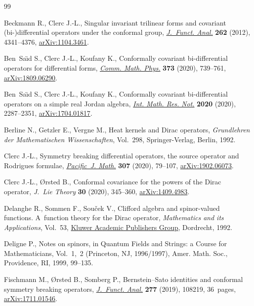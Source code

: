 \begin{thebibliography}{99}
\footnotesize\itemsep=0pt

Beckmann R., Clerc J.-L., Singular invariant trilinear forms and covariant
 (bi-)differential operators under the conformal group, \href{https://doi.org/10.1016/j.jfa.2012.02.021}{\textit{J.~Funct.
 Anal.}} \textbf{262} (2012), 4341--4376, \href{https://arxiv.org/abs/1104.3461}{arXiv:1104.3461}.

Ben~Sa\"{\i}d S., Clerc J.-L., Koufany K., Conformally covariant bi-differential
 operators for differential forms, \href{https://doi.org/10.1007/s00220-019-03431-6}{\textit{Comm. Math. Phys.}} \textbf{373}
 (2020), 739--761, \href{https://arxiv.org/abs/1809.06290}{arXiv:1809.06290}.

Ben~Sa\"{\i}d S., Clerc J.-L., Koufany K., Conformally covariant bi-differential
 operators on a simple real {J}ordan algebra, \href{https://doi.org/10.1093/imrn/rny082}{\textit{Int. Math. Res. Not.}}
 \textbf{2020} (2020), 2287--2351, \href{https://arxiv.org/abs/1704.01817}{arXiv:1704.01817}.

Berline N., Getzler E., Vergne M., Heat kernels and {D}irac operators,
 \textit{Grundlehren der Mathematischen Wissenschaften}, Vol.~298, Springer-Verlag, Berlin, 1992.

Clerc J.-L., Symmetry breaking differential operators, the source operator and
 {R}odrigues formulae, \href{https://doi.org/10.2140/pjm.2020.307.79}{\textit{Pacific~J. Math.}} \textbf{307} (2020), 79--107,
 \href{https://arxiv.org/abs/1902.06073}{arXiv:1902.06073}.

Clerc J.-L., {\O}rsted B., Conformal covariance for the powers of the {D}irac
 operator, \textit{J.~Lie Theory} \textbf{30} (2020), 345--360,
 \href{https://arxiv.org/abs/1409.4983}{arXiv:1409.4983}.

Delanghe R., Sommen F., Sou\v{c}ek V., Clifford algebra and spinor-valued
 functions. A~function theory for the Dirac operator, \textit{Mathematics and
 its Applications}, Vol.~53, \href{https://doi.org/10.1007/978-94-011-2922-0}{Kluwer Academic Publishers Group}, Dordrecht,
 1992.

Deligne P., Notes on spinors, in Quantum Fields and Strings: a Course for
 Mathematicians, {V}ol.~1,~2 ({P}rinceton, {NJ}, 1996/1997), Amer. Math. Soc.,
 Providence, RI, 1999, 99--135.

Fischmann M., {\O}rsted B., Somberg P., Bernstein--{S}ato identities and
 conformal symmetry breaking operators, \href{https://doi.org/10.1016/j.jfa.2019.04.002}{\textit{J.~Funct. Anal.}} \textbf{277}
 (2019), 108219, 36~pages, \href{https://arxiv.org/abs/1711.01546}{arXiv:1711.01546}.


\end{thebibliography}
